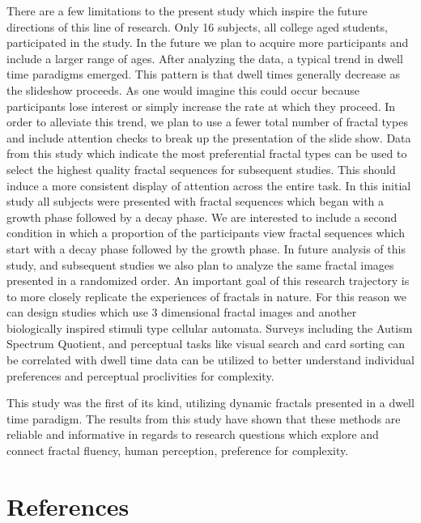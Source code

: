 \documentclass[english,jou]{apa6}
\begin{document}
There are a few limitations to the present study which inspire the future directions of this line of research. Only 16 subjects, all college aged students, participated in the study. In the future we plan to acquire more participants and include a larger range of ages. After analyzing the data, a typical trend in dwell time paradigms emerged. This pattern is that dwell times generally decrease as the slideshow proceeds. As one would imagine this could occur because participants lose interest or simply increase the rate at which they proceed. In order to alleviate this trend, we plan to use a fewer total number of fractal types and include attention checks to break up the presentation of the slide show. Data from this study which indicate the most preferential fractal types can be used to select the highest quality fractal sequences for subsequent studies. This should induce a more consistent display of attention across the entire task. In this initial study all subjects were presented with fractal sequences which began with a growth phase followed by a decay phase. We are interested to include a second condition in which a proportion of the participants view fractal sequences which start with a decay phase followed by the growth phase. In future analysis of this study, and subsequent studies we also plan to analyze the same fractal images presented in a randomized order. An important goal of this research trajectory is to more closely replicate the experiences of fractals in nature. For this reason we can design studies which use 3 dimensional fractal images and another biologically inspired stimuli type cellular automata. Surveys including the Autism Spectrum Quotient, and perceptual tasks like visual search and card sorting can be correlated with dwell time data can be utilized to better understand individual preferences and perceptual proclivities for complexity.

This study was the first of its kind, utilizing dynamic fractals presented in a dwell time paradigm. The results from this study have shown that these methods are reliable and informative in regards to research questions which explore and connect fractal fluency, human perception, preference for complexity.

\newpage

\hypertarget{references}{%
\section{References}\label{references}}
\end{document}
